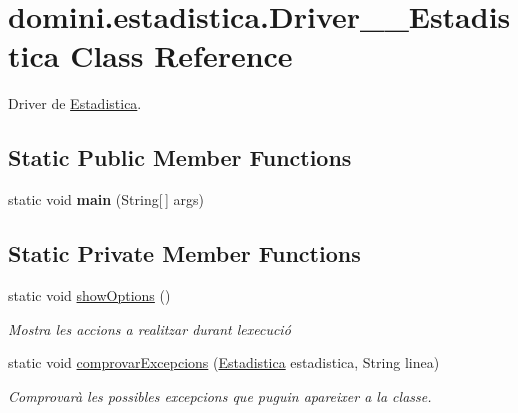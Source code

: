 \hypertarget{classdomini_1_1estadistica_1_1Driver____Estadistica}{}\section{domini.\+estadistica.\+Driver\+\_\+\+\_\+\+Estadistica Class Reference}
\label{classdomini_1_1estadistica_1_1Driver____Estadistica}


Driver de \hyperlink{classdomini_1_1estadistica_1_1Estadistica}{Estadistica}.  


\subsection*{Static Public Member Functions}
\begin{DoxyCompactItemize}
\item 
\mbox{\label{classdomini_1_1estadistica_1_1Driver____Estadistica_a7f11e0ccad919e427af9c591cf910bfe}} 
static void {\bfseries main} (String\mbox{[}$\,$\mbox{]} args)
\end{DoxyCompactItemize}
\subsection*{Static Private Member Functions}
\begin{DoxyCompactItemize}
\item 
\mbox{\label{classdomini_1_1estadistica_1_1Driver____Estadistica_ab42f06b8996094e10bd087ccf2f749e7}} 
static void \hyperlink{classdomini_1_1estadistica_1_1Driver____Estadistica_ab42f06b8996094e10bd087ccf2f749e7}{show\+Options} ()
\begin{DoxyCompactList}\small\item\em Mostra les accions a realitzar durant l\textquotesingle{}execució \end{DoxyCompactList}\item 
static void \hyperlink{classdomini_1_1estadistica_1_1Driver____Estadistica_a3459f11af9841b23ac81a409a3e84e22}{comprovar\+Excepcions} (\hyperlink{classdomini_1_1estadistica_1_1Estadistica}{Estadistica} estadistica, String linea)
\begin{DoxyCompactList}\small\item\em Comprovarà les possibles excepcions que puguin apareixer a la classe. \end{DoxyCompactList}\end{DoxyCompactItemize}


